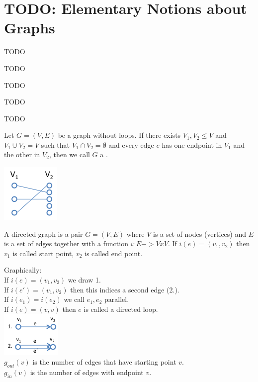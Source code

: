 \chapter{TODO: Elementary Notions about Graphs}

\begin{descr}
    TODO
\end{descr}


\begin{definition}
    TODO
\end{definition}
\begin{definition}
    TODO
\end{definition}
\begin{definition}
    TODO
\end{definition}
\begin{lemma}
    TODO
\end{lemma}

\begin{definition}
    Let $G = (V,E)$ be a graph without loops. If there exists $V_{1}, V_{2} \leq V$ and $V_{1} \cup V_{2} = V$
    such that $V_{1} \cap V_{2} = \emptyset$ and every edge $e$ has one endpoint in $V{_1}$ and the other in $V_{2}$,
    then we call $G$ a .
\end{definition}

\begin{example*}
    \includegraphics{diagrams/def14_example1.png}
\end{example*}

\begin{definition}
    A directed graph is a pair $G = (V,E)$ where $V$ is a set of nodes (vertices) and $E$ is a set of edges together 
    with a function $i: E -> V x V$. If $i(e) = (v_{1},v_{2})$ then $v_{1}$ is called start point, $v_{2}$ is called end point.
\end{definition}
Graphically: \\[3mm]
If $i(e) = (v_{1},v_{2})$ we draw 1. \\
If $i(e') = (v_{1},v_{2})$ then this indices a second edge (2.). \\
If $i(e_{1}) = i(e_{2})$ we call $e_{1},e_{2}$ parallel. \\
If $i(e) = (v,v)$ then $e$ is called a directed loop. \\
\includegraphics{diagrams/def15_directd_graph.png} \\
$g_{out}(v)$ is the number of edges that have starting point $v$. \\
$g_{in}(v)$ is the number of edges with endpoint $v$.

